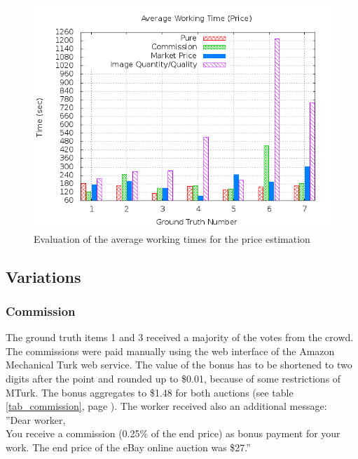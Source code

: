 \begin{figure}
\centering
\includegraphics[scale=0.55]{images/plots/crowdsourcing/plot_time_price.png}
\caption{Evaluation of the average working times for the price estimation}
\label{crowdsourcing_time_price}
\end{figure}
\subsection{Variations}
\subsubsection{Commission}
The ground truth items 1 and 3 received a majority of the votes from the crowd. The commissions were paid manually using the web interface of the Amazon Mechanical Turk web service. The value of the bonus has to be shortened to two digits after the point and rounded up to \$0.01, because of some restrictions of MTurk. The bonus aggregates to \$1.48 for both auctions (see table \ref{tab_commission}, page \pageref{tab_commission}). The worker received also an additional message: \\
''Dear worker, \\

You receive a commission (0.25\% of the end price) as bonus payment for your work. The end price of the eBay online auction was \$27.''

